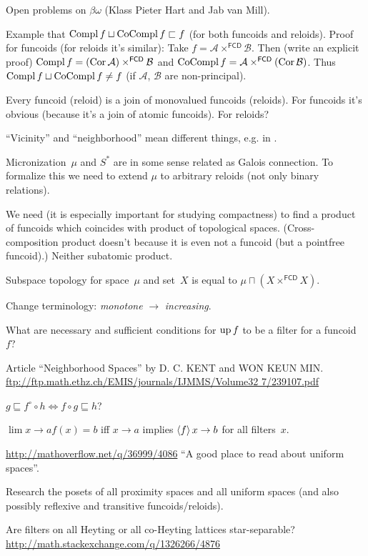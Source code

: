 \documentclass{amsart}
\begin{document}
Open problems on $\beta\omega$ (Klass Pieter Hart and Jab van Mill).

Example that $\operatorname{Compl} f\sqcup\operatorname{CoCompl} f\sqsubset f$ (for both funcoids and reloids).
Proof for funcoids (for reloids it's similar): Take $f=\mathcal{A}\times^{\mathsf{FCD}}\mathcal{B}$. Then (write an explicit proof)
$\operatorname{Compl} f=(\operatorname{Cor}\mathcal{A})\times^{\mathsf{FCD}}\mathcal{B}$ and $\operatorname{CoCompl} f=\mathcal{A}\times^{\mathsf{FCD}}(\operatorname{Cor}\mathcal{B})$.
Thus $\operatorname{Compl} f\sqcup\operatorname{CoCompl} f\ne f$ (if $\mathcal{A}$, $\mathcal{B}$ are non-principal).

Every funcoid (reloid) is a join of monovalued funcoids (reloids). For funcoids it's obvious
(because it's a join of atomic funcoids). For reloids?

``Vicinity'' and ``neighborhood'' mean different things, e.g. in \cite{converg}.

Micronization~$\mu$ and $S^\ast$ are in some sense related as Galois connection.
To formalize this we need to extend $\mu$ to arbitrary reloids (not only binary relations).

We need (it is especially important for studying compactness) to find a product of funcoids which coincides with
product of topological spaces. (Cross-composition product doesn't because it is even not a funcoid (but a pointfree funcoid).)
Neither subatomic product.

Subspace topology for space~$\mu$ and set~$X$ is equal to $\mu\sqcap(X\times^{\mathsf{FCD}} X)$.

Change terminology: \emph{monotone} $\rightarrow$ \emph{increasing}.

What are necessary and sufficient conditions for $\operatorname{up} f$ to be a filter for a funcoid~$f$?

Article ``Neighborhood Spaces'' by D. C. KENT and WON KEUN MIN.
\url{ftp://ftp.math.ethz.ch/EMIS/journals/IJMMS/Volume32 7/239107.pdf}

$g\sqsubseteq f^{\circ}\circ h \Leftrightarrow f\circ g\sqsubseteq h$?

$\lim {x\rightarrow a} f(x) = b$ iff $x\rightarrow a$ implies $\left\langle f\right\rangle x\rightarrow b$ for all filters~$x$.

\url{http://mathoverflow.net/q/36999/4086} ``A good place to read about uniform spaces''.

Research the posets of all proximity spaces and all uniform spaces (and also possibly reflexive and transitive funcoids/reloids).

Are filters on all Heyting or all co-Heyting lattices star-separable?
\url{http://math.stackexchange.com/q/1326266/4876}
\end{document}
